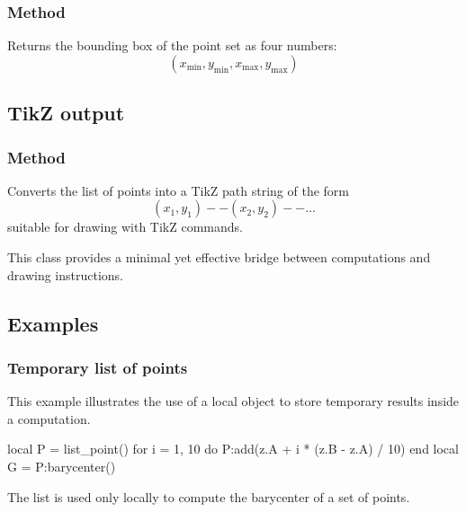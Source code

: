 \subsubsection{Method }
\label{ssub:meth_list_point_bbox}

Returns the bounding box of the point set as four numbers:
\[
  (x_{\min}, y_{\min}, x_{\max}, y_{\max})
\]


\subsection{TikZ output}
\label{subsec:list_point_output}

\subsubsection{Method }
\label{ssub:meth_list_point_to_path}

Converts the list of points into a TikZ path string of the form
\[
  (x_1,y_1) -- (x_2,y_2) -- \dots
\]
suitable for drawing with TikZ commands.


\medskip

This class provides a minimal yet effective bridge between  computations and  drawing instructions.


\subsection{Examples}
\label{subsec:list_point_examples}

\subsubsection{Temporary list of points}
\label{ssub:list_point_example_local}

This example illustrates the use of a local  object to store
temporary results inside a computation.

\begin{tkzexample}
local P = list_point()
for i = 1, 10 do
  P:add(z.A + i * (z.B - z.A) / 10)
end
local G = P:barycenter()
\end{tkzexample}

The list  is used only locally to compute the barycenter of a set of points.

